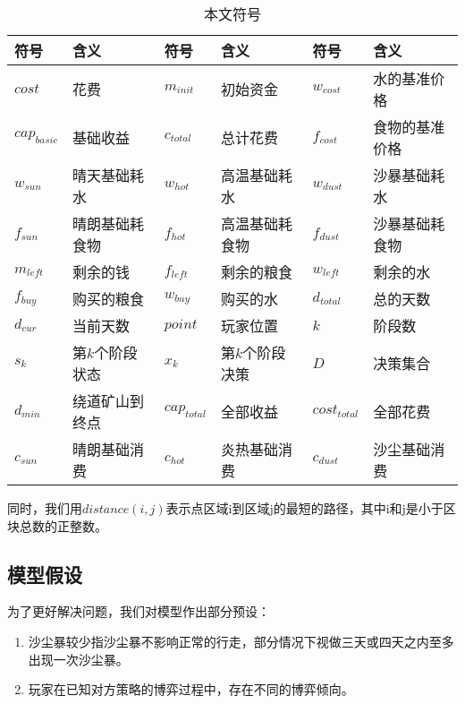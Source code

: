 \documentclass[withoutpreface,bwprint]{cumcmthesis} %
\begin{document}
\begin{table}[!htbp]
    \caption{本文符号}\label{tab:sign} \centering
    \begin{tabular}{p{1.5cm}p{3cm}|p{1.5cm}p{3cm}|p{1.5cm}p{3cm}}
        \toprule[1.5pt]
        符号 & 含义 & 符号 & 含义 & 符号 & 含义\\
        \midrule[1pt]
        $cost$ & 花费 & $m_{init}$ & 初始资金 & $w_{cost}$ & 水的基准价格 \\
        $cap_{basic}$ & 基础收益 & $c_{total}$ & 总计花费  & $f_{cost}$ & 食物的基准价格 \\
        $w_{sun}$ & 晴天基础耗水 & $w_{hot}$ & 高温基础耗水 & $w_{dust}$ & 沙暴基础耗水 \\
        $f_{sun}$ & 晴朗基础耗食物 & $f_{hot}$ & 高温基础耗食物 & $f_{dust}$ & 沙暴基础耗食物\\ 
        $m_{left}$ & 剩余的钱 & $f_{left}$ & 剩余的粮食 & $w_{left}$ & 剩余的水 \\
        $f_{buy}$ & 购买的粮食 & $w_{buy}$ & 购买的水 & $d_{total}$ & 总的天数 \\ 
        $d_{cur}$ & 当前天数 & $point$ & 玩家位置 & $k$ & 阶段数 \\
        $s_k$ & 第$k$个阶段状态 & $x_k$ & 第$k$个阶段决策 & $D$ & 决策集合 \\ 
        $d_{min}$ & 绕道矿山到终点 & $cap_{total}$ & 全部收益  & $cost_{total}$ & 全部花费   \\
        $c_{sun}$ & 晴朗基础消费 & $c_{hot}$ & 炎热基础消费  & $c_{dust}$ & 沙尘基础消费    \\
        \bottomrule[1.5pt]
    \end{tabular}
\end{table}

同时，我们用$distance(i,j)$表示点区域i到区域j的最短的路径，其中i和j是小于区块总数的正整数。


\subsection{模型假设}

\label{sub:assumption}

为了更好解决问题，我们对模型作出部分预设：

\begin{enumerate}
    \item 沙尘暴较少指沙尘暴不影响正常的行走，部分情况下视做三天或四天之内至多出现一次沙尘暴。
    \item 玩家在已知对方策略的博弈过程中，存在不同的博弈倾向。
\end{enumerate}
\end{document}
